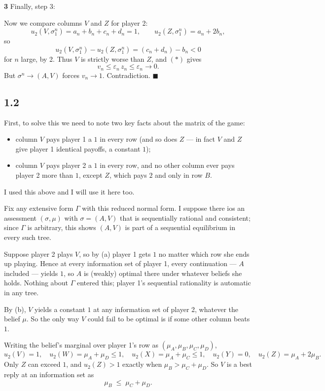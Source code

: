 \documentclass[12pt]{article}
\begin{document}
\textbf{3}
Finally, step 3: 

Now we compare columns $V$ and $Z$ for player 2:
\[
u_2(V,\sigma^n_1) = a_n + b_n + c_n + d_n = 1,
\qquad
u_2(Z,\sigma^n_1) = a_n + 2b_n,
\]
so
\[
u_2(V,\sigma^n_1) - u_2(Z,\sigma^n_1) = (c_n + d_n) - b_n < 0
\]
for $n$ large, by 2. Thus $V$ is strictly worse than $Z$, and $(\ast)$
gives
\[
v_n \le \varepsilon_n\, z_n \le \varepsilon_n \to 0 .
\]
But $\sigma^n \to (A,V)$ forces $v_n \to 1$. Contradiction. \qquad$\blacksquare$

 \subsection*{1.2}
First, to solve this we need to note two key facts about the matrix of the game:
\begin{itemize}
\item[(a)] column $V$ pays player 1 a $1$ in every row (and so does $Z$ --- in fact
$V$ and $Z$ give player 1 identical payoffs, a constant $1$);
\item[(b)] column $V$ pays player 2 a $1$ in every row, and no other column ever pays
player 2 more than $1$, except $Z$, which pays $2$ and only in row $B$.
\end{itemize}
I used this above and I will use it here too. 

Fix any extensive form $\Gamma$ with this reduced normal form. I suppose there ios an assessment
$(\sigma,\mu)$ with $\sigma=(A,V)$ that is sequentially rational and consistent; since
$\Gamma$ is arbitrary, this shows $(A,V)$ is part of a sequential equilibrium in every
such tree.

Suppose player 2 plays $V$, so by (a) player 1 gets $1$ no matter which row she ends up
playing. Hence at every information set of player 1, every continuation --- $A$
included --- yields $1$, so $A$ is (weakly) optimal there under whatever beliefs she
holds. Nothing about $\Gamma$ entered this; player 1's sequential rationality is
automatic in any tree.

By (b), $V$ yields a constant $1$ at any information set of player 2, whatever the belief $\mu$. So the only way $V$ could fail to be optimal is if some other column beats $1$.

Writing the belief's marginal over player 1's row as $(\mu_A,\mu_B,\mu_C,\mu_D)$,
\[
u_2(V) = 1,\quad u_2(W)=\mu_A+\mu_D\le 1,\quad u_2(X)=\mu_A+\mu_C\le 1,\quad
u_2(Y)=0,\quad u_2(Z)=\mu_A+2\mu_B .
\]
Only $Z$ can exceed $1$, and $u_2(Z)>1$ exactly when $\mu_B>\mu_C+\mu_D$. So $V$ is a best reply at an information set as
\[
\mu_B \;\le\; \mu_C+\mu_D .
\]
\end{document}
